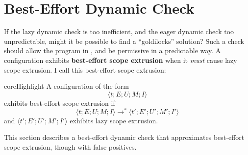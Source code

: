 \section{Best-Effort Dynamic Check}\label{section:best-effort-check}
If the lazy dynamic check is too inefficient, and the eager dynamic check too unpredictable, might it be possible to find a ``goldilocks'' solution? Such a check should allow the program in , and be permissive in a predictable way. A configuration exhibits \textbf{best-effort scope extrusion} when it \textit{must} cause lazy scope extrusion. I call this best-effort scope extrusion:

\begin{definition}{coreHighlight} A \coreLang{} configuration of the form 
\[\langle t;E;U;M;I\rangle\]  
exhibits best-effort scope extrusion if 
\[ \langle t;E;U;M;I\rangle \to^{*} \langle t';E';U';M';I'\rangle\]
and $\langle t';E';U';M';I'\rangle$ exhibits lazy scope extrusion.
\end{definition}

This section describes a best-effort dynamic check that approximates best-effort scope extrusion, though with false positives. 

